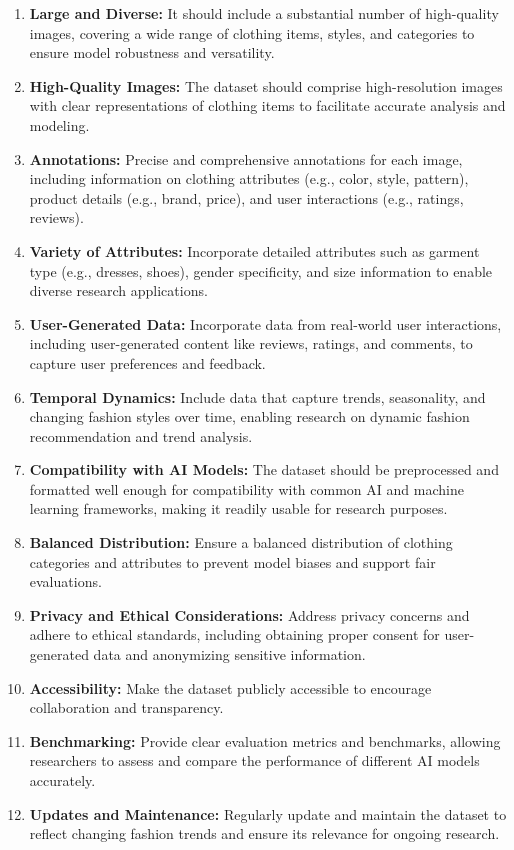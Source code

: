 		\begin{enumerate}
			\item \textbf{Large and Diverse:} It should include a substantial number of high-quality images, covering a wide range of clothing items, styles, and categories to ensure model robustness and versatility.
			\item \textbf{High-Quality Images:} The dataset should comprise high-resolution images with clear representations of clothing items to facilitate accurate analysis and modeling.
			\item \textbf{Annotations:} Precise and comprehensive annotations for each image, including information on clothing attributes (e.g., color, style, pattern), product details (e.g., brand, price), and user interactions (e.g., ratings, reviews).
			\item \textbf{Variety of Attributes:} Incorporate detailed attributes such as garment type (e.g., dresses, shoes), gender specificity, and size information to enable diverse research applications.
			\item \textbf{User-Generated Data:} Incorporate data from real-world user interactions, including user-generated content like reviews, ratings, and comments, to capture user preferences and feedback.
			\item \textbf{Temporal Dynamics:} Include data that capture trends, seasonality, and changing fashion styles over time, enabling research on dynamic fashion recommendation and trend analysis.
			\item \textbf{Compatibility with AI Models:} The dataset should be preprocessed and formatted well enough for compatibility with common AI and machine learning frameworks, making it readily usable for research purposes.
			\item \textbf{Balanced Distribution:} Ensure a balanced distribution of clothing categories and attributes to prevent model biases and support fair evaluations.
			\item \textbf{Privacy and Ethical Considerations:} Address privacy concerns and adhere to ethical standards, including obtaining proper consent for user-generated data and anonymizing sensitive information.
			\item \textbf{Accessibility:} Make the dataset publicly accessible to encourage collaboration and transparency.
			\item \textbf{Benchmarking:} Provide clear evaluation metrics and benchmarks, allowing researchers to assess and compare the performance of different AI models accurately.
			\item \textbf{Updates and Maintenance:} Regularly update and maintain the dataset to reflect changing fashion trends and ensure its relevance for ongoing research.
		\end{enumerate}

